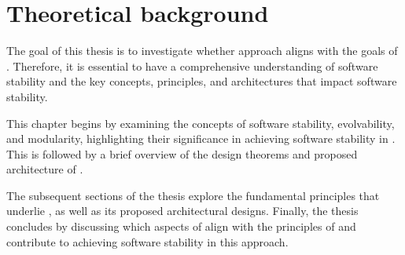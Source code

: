 \chapter{Theoretical background} \label{chap_theoreticalbackground} 

The goal of this thesis is to investigate whether \ca approach aligns with the goals
of \ns. Therefore, it is essential to have a comprehensive understanding of software
stability and the key concepts, principles, and architectures that impact software
stability.

This chapter begins by examining the concepts of software stability, evolvability, and
modularity, highlighting their significance in achieving software stability in \ns.
This is followed by a brief overview of the design theorems and proposed architecture of
\ns.

The subsequent sections of the thesis explore the fundamental principles that underlie
\ca, as well as its proposed architectural designs. Finally, the thesis
concludes by discussing which aspects of \ca align with the principles of
\ns and contribute to achieving software stability in this approach.



